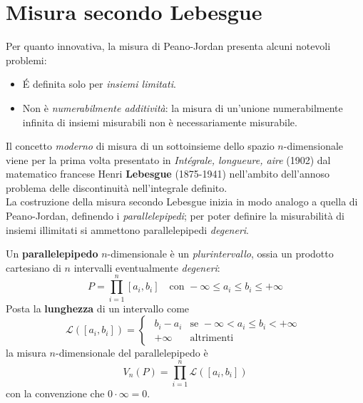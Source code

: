 	\section{Misura secondo Lebesgue}
	Per quanto innovativa, la misura di Peano-Jordan presenta alcuni notevoli problemi:
	\begin{itemize}
		\item É definita solo per \textit{insiemi limitati}.
		\item Non è \textit{numerabilmente additività}: la misura di un'unione numerabilmente infinita di insiemi misurabili non è necessariamente misurabile.
	\end{itemize}
	Il concetto \textit{moderno} di misura di un sottoinsieme dello spazio $n$-dimensionale viene per la prima volta presentato in \textit{Intégrale, longueure, aire} (1902)
	dal matematico francese Henri \textbf{Lebesgue} (1875-1941) nell'ambito dell'annoso problema delle discontinuità nell'integrale definito.\\
	La costruzione della misura secondo Lebesgue inizia in modo analogo a quella di Peano-Jordan, definendo i \textit{parallelepipedi}; per poter definire la misurabilità di insiemi illimitati si ammettono parallelepipedi \textit{degeneri}.
	\begin{define}
		Un \textbf{parallelepipedo} $n$-dimensionale è un \textit{plurintervallo}, ossia un prodotto cartesiano di $n$ intervalli eventualmente \textit{degeneri}:
		\begin{equation}
			P=\prod_{i=1}^{n}\left[a_i,b_i\right]\quad\text{con }-\infty \leq a_i \leq b_i \leq +\infty
		\end{equation}
		Posta la \textbf{lunghezza} di un intervallo come
		\begin{equation}
			\mathcal{L}\left(\left[a_i,b_i\right]\right)=
			\begin{cases}
				\begin{array}{ll}
					b_i-a_i & \text{se }-\infty < a_i \leq b_i < +\infty\\
					+\infty&\text{altrimenti}
				\end{array}
			\end{cases}
		\end{equation}
		la misura $n$-dimensionale del parallelepipedo è
		\begin{equation}
			V_n(P)=\prod_{i=1}^{n}\mathcal{L}\left(\left[a_i,b_i\right]\right)
		\end{equation}
		con la convenzione che $0\cdot \infty =0$.
	\end{define}
